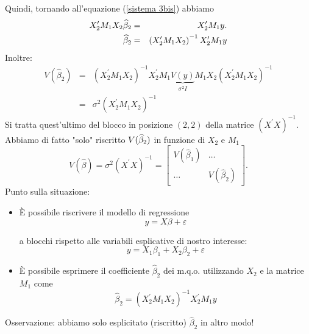 \documentclass[a4paper]{report}
\theoremstyle{remark}
\begin{document}
\noindent Quindi, tornando all'equazione (\ref{sistema 3bis}) abbiamo%
\begin{eqnarray}
X_{2}^{\prime }M_{1}X_{2}\widehat{\beta }_{2} &=&X_{2}^{\prime }M_{1}y. 
\notag \\
\widehat{\beta }_{2} &=&\left( X_{2}^{\prime }M_{1}X_{2}\right)
^{-1}X_{2}^{\prime }M_{1}y  \label{sistema 4}
\end{eqnarray}%
Inoltre:%
\begin{eqnarray*}
V(\widehat{\beta }_{2}) &=&\left( X_{2}^{\prime }M_{1}X_{2}\right)
^{-1}X_{2}^{\prime }M_{1}\underset{\sigma ^{2}I}{\underbrace{V(y)}}%
M_{1}X_{2}\left( X_{2}^{\prime }M_{1}X_{2}\right) ^{-1} \\
&=&\sigma ^{2}\left( X_{2}^{\prime }M_{1}X_{2}\right) ^{-1}
\end{eqnarray*}%
Si tratta quest'ultimo del blocco in posizione $(2,2)$ della matrice $\left(
X^{\prime }X\right) ^{-1}$. Abbiamo di fatto "solo" riscritto $V(\widehat{%
\beta }_{2})$ in funzione di $X_{2}$ e $M_{1}$%
\begin{equation*}
V(\widehat{\beta })=\sigma ^{2}\left( X^{\prime }X\right) ^{-1}=\left[ 
\begin{array}{cc}
V(\widehat{\beta }_{1}) & \ldots \\ 
\ldots & V(\widehat{\beta }_{2})%
\end{array}%
\right] .
\end{equation*}%
Punto sulla situazione:

\begin{itemize}
\item \`{E} possibile riscrivere il modello di regressione%
\begin{equation*}
y=X\beta +\varepsilon
\end{equation*}

a blocchi rispetto alle variabili esplicative di nostro interesse:%
\begin{equation*}
y=X_{1}\beta _{1}+X_{2}\beta _{2}+\varepsilon
\end{equation*}

\item \`{E} possibile esprimere il coefficiente $\widehat{\beta }_{2}$ dei
m.q.o. utilizzando $X_{2}$ e la matrice $M_{1}$ come%
\begin{equation*}
\widehat{\beta }_{2}=\left( X_{2}^{\prime }M_{1}X_{2}\right)
^{-1}X_{2}^{\prime }M_{1}y
\end{equation*}
\end{itemize}

\noindent Osservazione: abbiamo solo esplicitato (riscritto) $\widehat{\beta 
}_{2}$ in altro modo!
\end{document}

